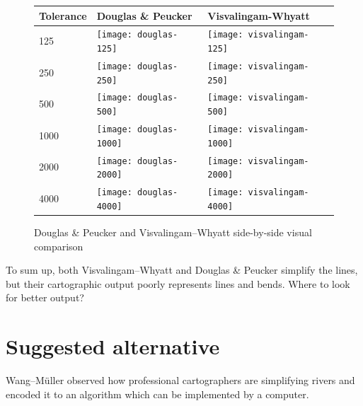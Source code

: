 \documentclass[a4paper]{article}
\newcommand{\DP}{Douglas \& Peucker}
\newcommand{\VW}{Visvalingam--Whyatt}
\newcommand{\WM}{Wang--M{\"u}ller}
\begin{document}
\begin{figure}[H]
    \renewcommand{\tabularxcolumn}[1]{>{\center\small}m{#1}}
    \begin{tabularx}{\textwidth}{ p{1.5cm} | X | X | }
        Tolerance                                                 &
        Douglas \& Peucker                                        &
        Visvalingam-Whyatt                                        \tabularnewline \hline

        125                                                       &
        \texttt{[image: douglas-125]}           &
        \texttt{[image: visvalingam-125]}       \tabularnewline \hline

        250                                                       &
        \texttt{[image: douglas-250]}         &
        \texttt{[image: visvalingam-250]}     \tabularnewline \hline

        500                                                       &
        \texttt{[image: douglas-500]}        &
        \texttt{[image: visvalingam-500]}    \tabularnewline \hline

        1000                                                      &
        \texttt{[image: douglas-1000]}      &
        \texttt{[image: visvalingam-1000]}  \tabularnewline \hline

        2000                                                      &
        \texttt{[image: douglas-2000]}     &
        \texttt{[image: visvalingam-2000]} \tabularnewline \hline

        4000                                                      &
        \texttt{[image: douglas-4000]}     &
        \texttt{[image: visvalingam-4000]} \tabularnewline \hline
    \end{tabularx}
    \caption{{\DP} and {\VW} side-by-side visual comparison}
    \label{tab:dp-vs-vw}
\end{figure}

To sum up, both {\VW} and {\DP} simplify the lines, but their cartographic
output poorly represents lines and bends. Where to look for better output?

\section{Suggested alternative}
\label{sec:suggested_alternative}

{\WM} observed how professional cartographers are simplifying rivers and encoded it
to an algorithm which can be implemented by a computer.
\end{document}
